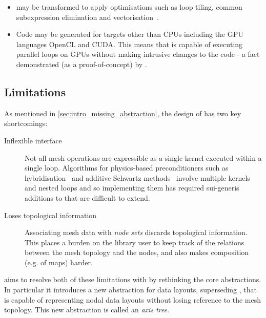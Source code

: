\documentclass[thesis]{subfiles}
\begin{document}
\begin{itemize}
  \item
     may be transformed to apply optimisations such as loop tiling, common subexpression elimination and vectorisation~\cite{sunStudyVectorizationMatrixfree2020}.
  \item
    Code may be generated for targets other than CPUs including the GPU languages OpenCL and CUDA.
    This means that  is capable of executing parallel loops on GPUs without making intrusive changes to the code - a fact demonstrated (as a proof-of-concept) by \cite{fenics2021-kulkarni}.
\end{itemize}

\subsection{Limitations}
\label{sec:pyop2_limitations}

As mentioned in \cref{sec:intro_missing_abstraction}, the design of  has two key shortcomings:

\begin{description}
  \item[Inflexible interface]
    Not all mesh operations are expressible as a single kernel executed within a single loop.
    Algorithms for physics-based preconditioners such as hybridisation~\cite{gibsonSlateExtendingFiredrake2020} and additive Schwartz methods~\cite{farrellPCPATCHSoftwareTopological2021} involve multiple kernels and nested loops and so implementing them has required sui-generis additions to  that are difficult to extend.

  \item[Loses topological information]
    Associating mesh data with \textit{node sets} discards topological information.
    This places a burden on the library user to keep track of the relations between the mesh topology and the nodes, and also makes composition (e.g. of maps) harder.
\end{description}

 aims to resolve both of these limitations with  by rethinking the core abstractions.
In particular it introduces a new abstraction for data layouts, superseding , that is capable of representing nodal data layouts without losing reference to the mesh topology.
This new abstraction is called an \emph{axis tree}.
\end{document}
